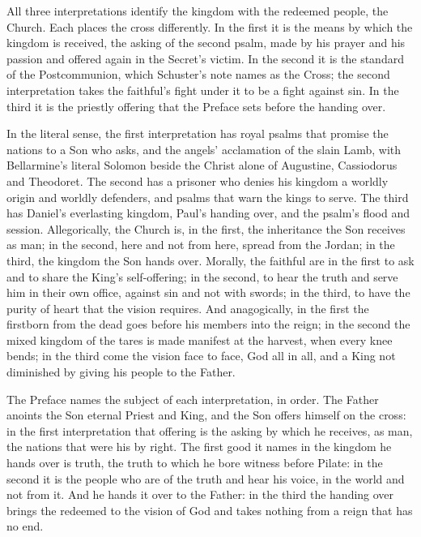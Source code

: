 All three interpretations identify the kingdom with the redeemed people, the
Church. Each places the cross differently. In the first it is the means
by which the kingdom is received, the asking of the second psalm, made by his
prayer and his passion and offered again in the Secret's victim. In the second
it is the standard of the Postcommunion, which Schuster's note names as the
Cross; the second interpretation takes the faithful's fight under it to be a
fight against sin. In the
third it is the priestly offering that the Preface sets before the handing
over.

In the literal sense, the first interpretation has royal psalms that promise
the nations to a Son who asks, and the angels' acclamation of the slain Lamb,
with Bellarmine's literal Solomon beside the Christ alone of Augustine,
Cassiodorus and Theodoret. The second has a prisoner who denies his kingdom a
worldly origin and worldly defenders, and psalms that warn the kings to serve.
The third has Daniel's everlasting kingdom, Paul's handing over, and the
psalm's flood and session.
Allegorically, the Church is, in the first, the inheritance the Son receives
as man; in the second, here and not from here, spread from the Jordan; in the
third, the kingdom the Son hands over. Morally, the faithful are in the first
to ask and to share the King's self-offering; in the second, to hear the truth
and serve him in their own office, against sin and not with swords; in the
third, to have the purity of heart that the vision requires. And
anagogically, in the first the firstborn from the dead goes before his members
into the reign; in the second the mixed kingdom of the tares is made manifest
at the harvest, when every knee bends; in the third come the vision face to
face, God all in all, and a King not diminished by giving his people to the
Father.

The Preface names the subject of each interpretation, in order. The Father
anoints the Son eternal Priest and King, and the Son offers himself on
the cross: in the first interpretation that offering is the asking by which he
receives, as man, the nations that were his by right. The first good it names in
the kingdom he hands over is truth, the truth to which he bore witness before
Pilate: in the second it is the people who are of the truth and hear his
voice, in the world and not from it. And he hands it over to the Father: in
the third the handing over brings the redeemed to the vision of God and takes
nothing from a reign that has no end.
